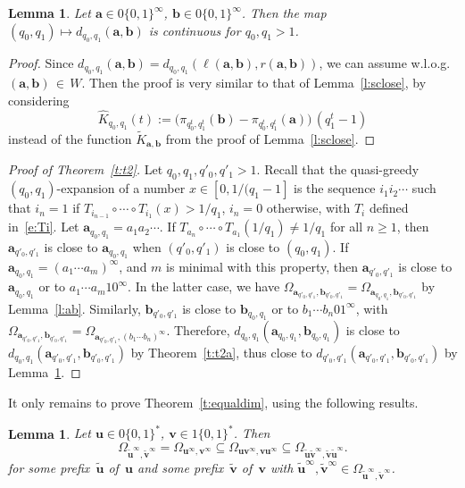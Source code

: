\documentclass{amsart}
\newtheorem{lemma}[theorem]{Lemma}
\theoremstyle{definition}
\numberwithin{equation}{section}
\newcommand{\ba}{\mathbf{a}}
\newcommand{\bb}{\mathbf{b}}
\newcommand{\bu}{\mathbf{u}}
\newcommand{\bv}{\mathbf{v}}
\begin{document}
\begin{lemma} \label{l:qclose}
Let $\ba \in 0\{0,1\}^\infty\!$, $\bb \in 0\{0,1\}^\infty\!$.
Then the map $(q_0,q_1) \mapsto d_{q_0,q_1}(\ba,\bb)$ is continuous for $q_0,q_1 > 1$.
\end{lemma}

\begin{proof}
Since $d_{q_0,q_1}(\ba,\bb) = d_{q_0,q_1}(\ell(\ba,\bb),r(\ba,\bb))$, we can assume w.l.o.g.\ $(\ba,\bb) {\,\in\,} W$.
Then the proof is very similar to that of Lemma~\ref{l:sclose}, by considering
\[
\hat{K}_{q_0, q_1}(t) := \big(\pi_{q_0^t,q_1^t}(\bb) - \pi_{q_0^t,q_1^t}(\ba)\big)\,  (q_1^t{-}1)
\]
instead of the function $\tilde{K}_{\ba,\bb}$ from the proof of Lemma~\ref{l:sclose}.
\end{proof}

\begin{proof}[Proof of Theorem~\ref{t:t2}]
Let $q_0,q_1,q'_0,q'_1>1$. 
Recall that the quasi-greedy $(q_0,q_1)$-expansion of a number $x \in [0,1/(q_1{-}1]$ is the sequence $i_1i_2\cdots$ such that $i_n=1$ if $T_{i_{n-1}} \circ \cdots \circ T_{i_1}(x) > 1/q_1$, $i_n = 0$ otherwise, with $T_i$ defined in~\eqref{e:Ti}.
Let $\ba_{q_0,q_1} = a_1a_2\cdots$. 
If $T_{a_n} \circ \cdots \circ T_{a_1}(1/q_1) \ne 1/q_1$ for all $n \ge 1$, then $\ba_{q'_0,q'_1}$ is close to $\ba_{q_0,q_1}$ when $(q'_0,q'_1)$ is close to $(q_0,q_1)$.
If $\ba_{q_0,q_1} = (a_1\cdots a_m)^\infty$, and $m$ is minimal with this property, then $\ba_{q'_0,q'_1}$ is close to $\ba_{q_0,q_1}$ or to $a_1\cdots a_m 10^\infty$. 
In the latter case, we have $\Omega_{\ba_{q'_0,q'_1},\bb_{q'_0,q'_1}} = \Omega_{\ba_{q_0,q_1},\bb_{q'_0,q'_1}}$ by Lemma~\ref{l:ab}.
Similarly, $\bb_{q'_0,q'_1}$ is close to $\bb_{q_0,q_1}$ or to $b_1\cdots b_n 01^\infty$, with $\Omega_{\ba_{q'_0,q'_1},\bb_{q'_0,q'_1}} = \Omega_{\ba_{q'_0,q'_1},(b_1\cdots b_n)^\infty}$. 
Therefore, $d_{q_0,q_1}(\ba_{q_0,q_1},\bb_{q_0,q_1})$ is close to $d_{q_0,q_1}(\ba_{q'_0,q'_1},\bb_{q'_0,q'_1})$ by Theorem~\ref{t:t2a}, thus close to $d_{q'_0,q'_1}(\ba_{q'_0,q'_1},\bb_{q'_0,q'_1})$ by Lemma~\ref{l:qclose}.
\end{proof}

It only remains to prove Theorem~\ref{t:equaldim}, using the following results.

\begin{lemma} \label{l:uvtilde}
Let $\bu \in 0\{0,1\}^*$, $\bv \in 1\{0,1\}^*$.
Then
\[
\Omega_{\tilde{\bu}^\infty,\tilde{\bv}^\infty} = \Omega_{\bu^\infty,\bv^\infty} \subseteq \Omega_{\bu\bv^\infty,\bv\bu^\infty} \subseteq \Omega_{\tilde{\bu}\tilde{\bv}^\infty,\tilde{\bv}\tilde{\bu}^\infty}.
\]
for some prefix~$\tilde{\bu}$ of~$\bu$ and some prefix~$\tilde{\bv}$ of~$\bv$ with $\tilde{\bu}^\infty, \tilde{\bv}^\infty \in \Omega_{\tilde{\bu}^\infty,\tilde{\bv}^\infty}$.
\end{lemma}
\end{document}
